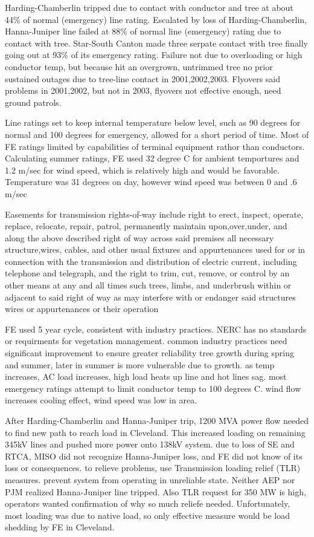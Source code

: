 Harding-Chamberlin tripped due to contact with conductor and tree at about 44\% of normal (emergency) line rating.  Escalated by loss of Harding-Chamberlin, Hanna-Juniper line failed at 88\% of normal line (emergency)  rating due to contact with tree.  Star-South Canton made three serpate contact with tree finally going out at 93\% of its emergency rating.  Failure not due to overloading or high conductor temp, but because hit an overgrown, untrimmed tree
no prior sustained outages due to tree-line contact in 2001,2002,2003.  Flyovers said problems in 2001,2002, but not in 2003, flyovers not effective enough, need ground patrols.

Line ratings set to keep internal temperature below level, such as 90 degrees for normal and 100 degrees for emergency, allowed for a short period of time.  Most of FE ratings limited by capabilities of terminal equipment rathor than conductors.  Calculating summer ratings, FE used 32 degree C for ambient temportures and 1.2 m/sec for wind speed, which is relatively high and would be favorable.  Temperature was 31 degrees on day, however wind speed was between 0 and .6 m/sec

Easements for transmission rights-of-way include
right to erect, inspect, operate, replace, relocate, repair, patrol, permanently maintain upon,over,under, and along the above described right of way across said premises all necessary structure,wires, cables, and other usual fixtures and appurtenances used for or in connection with the transmission and distribution of electric current, including telephone and telegraph, and the right to trim, cut, remove, or control by an other means at any and all times such trees, limbs, and underbrush within or adjacent to said right of way as may interfere with or endanger said structures wires or appurtenances or their operation

FE used 5 year cycle, consistent with industry practices.  NERC has no standards or requirments for vegetation management.  common industry practices need significant improvement to ensure greater reliability
tree growth during spring and summer, later in summer is more vulnerable due to growth.  as temp increases, AC load increases, high load heats up line and hot lines sag.  most emergency ratings attempt to limit conductor temp to 100 degrees C. wind flow increases cooling effect, wind speed was low in area.

After Harding-Chamberlin and Hanna-Juniper trip, 1200 MVA power flow needed to find new path to reach load in Cleveland.  This increased loading on remaining 345kV lines and pushed more power onto 138kV system.
due to loss of SE and RTCA, MISO did not recognize Hanna-Juniper loss, and FE did not know of its loss or consequences.
to relieve problems, use Transmission loading relief (TLR) measures. prevent system from operating in unreliable state.  Neither AEP nor PJM realized Hanna-Juniper line tripped. Also TLR request for 350 MW is high, operators wanted confirmation of why so much reliefe needed.  Unfortunately, most loading was due to native load, so only effective measure would be load shedding by FE in Cleveland.

